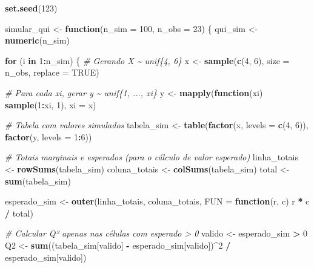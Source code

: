 \documentclass[
]{book}
\newenvironment{Shaded}{\begin{snugshade}}{\end{snugshade}}
\newcommand{\AttributeTok}[1]{\textcolor[rgb]{0.13,0.29,0.53}{#1}}
\newcommand{\CommentTok}[1]{\textcolor[rgb]{0.56,0.35,0.01}{\textit{#1}}}
\newcommand{\ConstantTok}[1]{\textcolor[rgb]{0.56,0.35,0.01}{#1}}
\newcommand{\ControlFlowTok}[1]{\textcolor[rgb]{0.13,0.29,0.53}{\textbf{#1}}}
\newcommand{\DecValTok}[1]{\textcolor[rgb]{0.00,0.00,0.81}{#1}}
\newcommand{\FunctionTok}[1]{\textcolor[rgb]{0.13,0.29,0.53}{\textbf{#1}}}
\newcommand{\NormalTok}[1]{#1}
\newcommand{\OtherTok}[1]{\textcolor[rgb]{0.56,0.35,0.01}{#1}}
\newcommand{\SpecialCharTok}[1]{\textcolor[rgb]{0.81,0.36,0.00}{\textbf{#1}}}
\begin{document}
\begin{Shaded}
\begin{Highlighting}[]
\FunctionTok{set.seed}\NormalTok{(}\DecValTok{123}\NormalTok{)}

\NormalTok{simular\_qui }\OtherTok{\textless{}{-}} \ControlFlowTok{function}\NormalTok{(}\AttributeTok{n\_sim =} \DecValTok{100}\NormalTok{, }\AttributeTok{n\_obs =} \DecValTok{23}\NormalTok{) \{}
\NormalTok{  qui\_sim }\OtherTok{\textless{}{-}} \FunctionTok{numeric}\NormalTok{(n\_sim)}
  
  \ControlFlowTok{for}\NormalTok{ (i }\ControlFlowTok{in} \DecValTok{1}\SpecialCharTok{:}\NormalTok{n\_sim) \{}
    \CommentTok{\# Gerando X \textasciitilde{} unif\{4, 6\}}
\NormalTok{    x }\OtherTok{\textless{}{-}} \FunctionTok{sample}\NormalTok{(}\FunctionTok{c}\NormalTok{(}\DecValTok{4}\NormalTok{, }\DecValTok{6}\NormalTok{), }\AttributeTok{size =}\NormalTok{ n\_obs, }\AttributeTok{replace =} \ConstantTok{TRUE}\NormalTok{)}
    
    \CommentTok{\# Para cada xi, gerar y \textasciitilde{} unif\{1, ..., xi\}}
\NormalTok{    y }\OtherTok{\textless{}{-}} \FunctionTok{mapply}\NormalTok{(}\ControlFlowTok{function}\NormalTok{(xi) }\FunctionTok{sample}\NormalTok{(}\DecValTok{1}\SpecialCharTok{:}\NormalTok{xi, }\DecValTok{1}\NormalTok{), }\AttributeTok{xi =}\NormalTok{ x)}
    
    \CommentTok{\# Tabela com valores simulados}
\NormalTok{    tabela\_sim }\OtherTok{\textless{}{-}} \FunctionTok{table}\NormalTok{(}\FunctionTok{factor}\NormalTok{(x, }\AttributeTok{levels =} \FunctionTok{c}\NormalTok{(}\DecValTok{4}\NormalTok{, }\DecValTok{6}\NormalTok{)), }\FunctionTok{factor}\NormalTok{(y, }\AttributeTok{levels =} \DecValTok{1}\SpecialCharTok{:}\DecValTok{6}\NormalTok{))}
    
    \CommentTok{\# Totais marginais e esperados (para o cálculo de valor esperado)}
\NormalTok{    linha\_totais }\OtherTok{\textless{}{-}} \FunctionTok{rowSums}\NormalTok{(tabela\_sim)}
\NormalTok{    coluna\_totais }\OtherTok{\textless{}{-}} \FunctionTok{colSums}\NormalTok{(tabela\_sim)}
\NormalTok{    total }\OtherTok{\textless{}{-}} \FunctionTok{sum}\NormalTok{(tabela\_sim)}
    
\NormalTok{    esperado\_sim }\OtherTok{\textless{}{-}} \FunctionTok{outer}\NormalTok{(linha\_totais, coluna\_totais, }\AttributeTok{FUN =} \ControlFlowTok{function}\NormalTok{(r, c) r }\SpecialCharTok{*}\NormalTok{ c }\SpecialCharTok{/}\NormalTok{ total)}
    
    \CommentTok{\# Calcular Q² apenas nas células com esperado \textgreater{} 0}
\NormalTok{    valido }\OtherTok{\textless{}{-}}\NormalTok{ esperado\_sim }\SpecialCharTok{\textgreater{}} \DecValTok{0}
\NormalTok{    Q2 }\OtherTok{\textless{}{-}} \FunctionTok{sum}\NormalTok{((tabela\_sim[valido] }\SpecialCharTok{{-}}\NormalTok{ esperado\_sim[valido])}\SpecialCharTok{\^{}}\DecValTok{2} \SpecialCharTok{/}\NormalTok{ esperado\_sim[valido])}
    

\end{Highlighting}
\end{Shaded}
\end{document}
